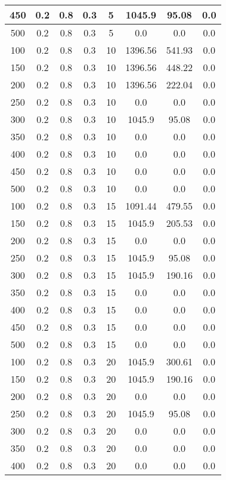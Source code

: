 \documentclass[a4paper, 12pt]{extreport}
\begin{document}
\begin{itemize}
\begin{longtable}{|c|c|c|c|c|c|c|c|}
			450 & 0.2 & 0.8 & 0.3 & 5 & 1045.9 & 95.08 & 0.0 \\\hline
			500 & 0.2 & 0.8 & 0.3 & 5 & 0.0 & 0.0 & 0.0 \\\hline
			100 & 0.2 & 0.8 & 0.3 & 10 & 1396.56 & 541.93 & 0.0 \\\hline
			150 & 0.2 & 0.8 & 0.3 & 10 & 1396.56 & 448.22 & 0.0 \\\hline
			200 & 0.2 & 0.8 & 0.3 & 10 & 1396.56 & 222.04 & 0.0 \\\hline
			250 & 0.2 & 0.8 & 0.3 & 10 & 0.0 & 0.0 & 0.0 \\\hline
			300 & 0.2 & 0.8 & 0.3 & 10 & 1045.9 & 95.08 & 0.0 \\\hline
			350 & 0.2 & 0.8 & 0.3 & 10 & 0.0 & 0.0 & 0.0 \\\hline
			400 & 0.2 & 0.8 & 0.3 & 10 & 0.0 & 0.0 & 0.0 \\\hline
			450 & 0.2 & 0.8 & 0.3 & 10 & 0.0 & 0.0 & 0.0 \\\hline
			500 & 0.2 & 0.8 & 0.3 & 10 & 0.0 & 0.0 & 0.0 \\\hline
			100 & 0.2 & 0.8 & 0.3 & 15 & 1091.44 & 479.55 & 0.0 \\\hline
			150 & 0.2 & 0.8 & 0.3 & 15 & 1045.9 & 205.53 & 0.0 \\\hline
			200 & 0.2 & 0.8 & 0.3 & 15 & 0.0 & 0.0 & 0.0 \\\hline
			250 & 0.2 & 0.8 & 0.3 & 15 & 1045.9 & 95.08 & 0.0 \\\hline
			300 & 0.2 & 0.8 & 0.3 & 15 & 1045.9 & 190.16 & 0.0 \\\hline
			350 & 0.2 & 0.8 & 0.3 & 15 & 0.0 & 0.0 & 0.0 \\\hline
			400 & 0.2 & 0.8 & 0.3 & 15 & 0.0 & 0.0 & 0.0 \\\hline
			450 & 0.2 & 0.8 & 0.3 & 15 & 0.0 & 0.0 & 0.0 \\\hline
			500 & 0.2 & 0.8 & 0.3 & 15 & 0.0 & 0.0 & 0.0 \\\hline
			100 & 0.2 & 0.8 & 0.3 & 20 & 1045.9 & 300.61 & 0.0 \\\hline
			150 & 0.2 & 0.8 & 0.3 & 20 & 1045.9 & 190.16 & 0.0 \\\hline
			200 & 0.2 & 0.8 & 0.3 & 20 & 0.0 & 0.0 & 0.0 \\\hline
			250 & 0.2 & 0.8 & 0.3 & 20 & 1045.9 & 95.08 & 0.0 \\\hline
			300 & 0.2 & 0.8 & 0.3 & 20 & 0.0 & 0.0 & 0.0 \\\hline
			350 & 0.2 & 0.8 & 0.3 & 20 & 0.0 & 0.0 & 0.0 \\\hline
			400 & 0.2 & 0.8 & 0.3 & 20 & 0.0 & 0.0 & 0.0 \\\hline

\end{longtable}
\end{itemize}
\end{document}
